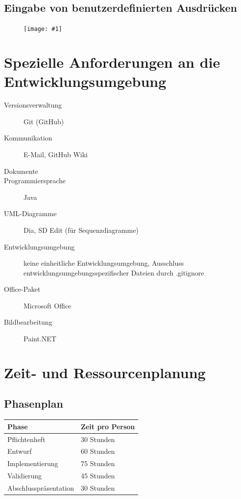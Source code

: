 \documentclass[a4paper,10pt]{article}
\newlength{\imgwidth}
\newcommand\scalegraphics[1]{
  \settowidth{\imgwidth}{\texttt{[image: \#1]}}
  \setlength{\imgwidth}{\minof{\imgwidth}{\textwidth}}
  \texttt{[image: \#1]}
}
\begin{document}
\subsection{Eingabe von benutzerdefinierten Ausdr\"{u}cken}
\begin{figure}[h!]
\begin{center}
\scalegraphics{images/mockupf2.png}
\end{center}
\end{figure}

\section{Spezielle Anforderungen an die Entwicklungsumgebung}
\begin{description}
  \item[Versionsverwaltung] Git (GitHub)
  \item[Kommunikation] E-Mail, GitHub Wiki
  \item[Dokumente] \LaTeXe
  \item[Programmiersprache] Java
  \item[UML-Diagramme] Dia, SD Edit (f\"{u}r Sequenzdiagramme)
  \item[Entwicklungsumgebung] keine einheitliche Entwicklungsumgebung, Ausschluss entwicklungsumgebungsspezifischer Dateien durch .gitignore
  \item[Office-Paket] Microsoft Office
  \item[Bildbearbeitung] Paint.NET
\end{description}

\section{Zeit- und Ressourcenplanung}
\subsection{Phasenplan}
\begin{tabular}[h]{| l | l |}
\hline
\textbf{Phase} & \textbf{Zeit pro Person}\\
\hline
Pflichtenheft & 30 Stunden\\
Entwurf & 60 Stunden\\
Implementierung & 75 Stunden\\
Validierung & 45 Stunden\\
Abschlusspr\"{a}sentation & 30 Stunden\\
\hline
\end{tabular}
\end{document}
